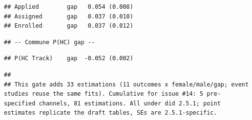 \documentclass[
]{article}
\begin{document}
\begin{verbatim}
## Applied        gap   0.054 (0.008) 
## Assigned       gap   0.037 (0.010) 
## Enrolled       gap   0.037 (0.012)
\end{verbatim}

\begin{verbatim}
## -- Commune P(HC) gap --
\end{verbatim}

\begin{verbatim}
## P(HC Track)    gap  -0.052 (0.002)
\end{verbatim}

\begin{verbatim}
## 
## This gate adds 33 estimations (11 outcomes x female/male/gap; event studies reuse the same fits). Cumulative for issue #14: 5 pre-specified channels, 81 estimations. All under did 2.5.1; point estimates replicate the draft tables, SEs are 2.5.1-specific.
\end{verbatim}
\end{document}
